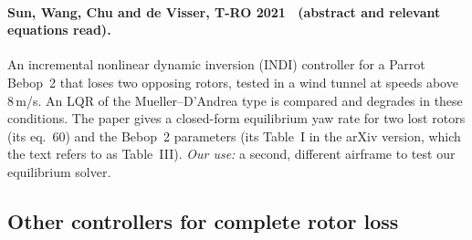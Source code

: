 \paragraph{Sun, Wang, Chu and de Visser, T-RO 2021~\cite{sun2020incremental} (abstract and relevant equations read).}
An incremental nonlinear dynamic inversion (INDI) controller for a Parrot Bebop~2 that loses two opposing rotors, tested in a wind tunnel at speeds above 8\,m/s. An LQR of the Mueller--D'Andrea type is compared and degrades in these conditions. The paper gives a closed-form equilibrium yaw rate for two lost rotors (its eq.~60) and the Bebop~2 parameters (its Table~I in the arXiv version, which the text refers to as Table~III).
\emph{Our use:} a second, different airframe to test our equilibrium solver.

\subsection{Other controllers for complete rotor loss}
